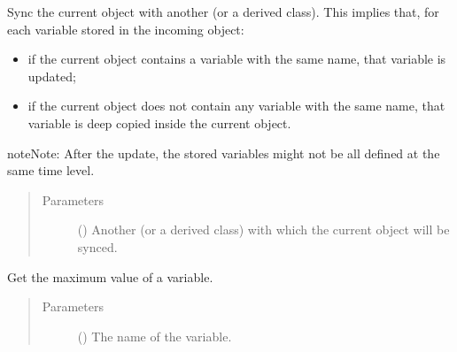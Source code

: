 \documentclass[letterpaper,10pt,english]{sphinxmanual}
\begin{document}
\begin{fulllineitems}
\begin{fulllineitems}
\begin{quote}
\begin{description}
\end{description}\end{quote}

\end{fulllineitems}


\begin{fulllineitems}
\label{\detokenize{api:storages.grid_data.GridData.extend_and_update}}
Sync the current object with another {\hyperref[\detokenize{api:storages.grid_data.GridData}]{}} (or a derived class).
This implies that, for each variable stored in the incoming object:
\begin{itemize}
\item {} 
if the current object contains a variable with the same name, that variable is updated;

\item {} 
if the current object does not contain any variable with the same name, that variable is deep copied inside                   the current object.

\end{itemize}

\begin{sphinxadmonition}{note}{Note:}
After the update, the stored variables might not be all defined at the same time level.
\end{sphinxadmonition}
\begin{quote}\begin{description}
\item[{Parameters}] \leavevmode
{} () \textendash{} Another {\hyperref[\detokenize{api:storages.grid_data.GridData}]{}} (or a derived class) with which the current object will be synced.

\end{description}\end{quote}

\end{fulllineitems}


\begin{fulllineitems}
\label{\detokenize{api:storages.grid_data.GridData.get_max}}
Get the maximum value of a variable.
\begin{quote}\begin{description}
\item[{Parameters}] \leavevmode
{} () \textendash{} The name of the variable.


\end{description}
\end{quote}
\end{fulllineitems}
\end{fulllineitems}
\end{document}
